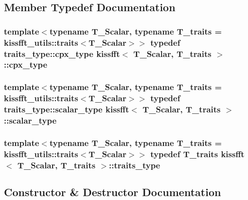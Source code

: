 \subsection{Member Typedef Documentation}
\subsubsection[{\texorpdfstring{cpx\+\_\+type}{cpx_type}}]{\setlength{\rightskip}{0pt plus 5cm}template$<$typename T\+\_\+\+Scalar, typename T\+\_\+traits = kissfft\+\_\+utils\+::traits$<$\+T\+\_\+\+Scalar$>$$>$ typedef traits\+\_\+type\+::cpx\+\_\+type {\bf kissfft}$<$ T\+\_\+\+Scalar, T\+\_\+traits $>$\+::{\bf cpx\+\_\+type}}\hypertarget{classkissfft_af66664488b0b1b2995f3e4c2f63a8b7d}{}\label{classkissfft_af66664488b0b1b2995f3e4c2f63a8b7d}
\subsubsection[{\texorpdfstring{scalar\+\_\+type}{scalar_type}}]{\setlength{\rightskip}{0pt plus 5cm}template$<$typename T\+\_\+\+Scalar, typename T\+\_\+traits = kissfft\+\_\+utils\+::traits$<$\+T\+\_\+\+Scalar$>$$>$ typedef traits\+\_\+type\+::scalar\+\_\+type {\bf kissfft}$<$ T\+\_\+\+Scalar, T\+\_\+traits $>$\+::{\bf scalar\+\_\+type}}\hypertarget{classkissfft_a074a5f74883901c625b6e80660d16ad4}{}\label{classkissfft_a074a5f74883901c625b6e80660d16ad4}
\subsubsection[{\texorpdfstring{traits\+\_\+type}{traits_type}}]{\setlength{\rightskip}{0pt plus 5cm}template$<$typename T\+\_\+\+Scalar, typename T\+\_\+traits = kissfft\+\_\+utils\+::traits$<$\+T\+\_\+\+Scalar$>$$>$ typedef T\+\_\+traits {\bf kissfft}$<$ T\+\_\+\+Scalar, T\+\_\+traits $>$\+::{\bf traits\+\_\+type}}\hypertarget{classkissfft_aa5a17184447b2a77c41e61f2d491bad5}{}\label{classkissfft_aa5a17184447b2a77c41e61f2d491bad5}


\subsection{Constructor \& Destructor Documentation}
